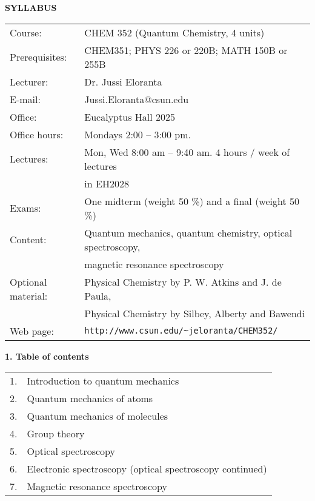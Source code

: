 \documentclass{report}
\begin{document}
\setlength{\parindent}{0pt}
\textbf{SYLLABUS}\\

\begin{tabular}{ll}
Course:   & CHEM 352 (Quantum Chemistry, 4 units)\\
Prerequisites: & CHEM351; PHYS 226 or 220B; MATH 150B or 255B\\
Lecturer: & Dr. Jussi Eloranta\\
E-mail:	  & Jussi.Eloranta@csun.edu\\
Office:	  & Eucalyptus Hall 2025\\
Office hours: & Mondays 2:00 -- 3:00 pm.\\
Lectures: & Mon, Wed 8:00 am -- 9:40 am. 4 hours / week of lectures\\
          & in EH2028\\
Exams: & One midterm (weight 50 \%) and a final (weight 50 \%)\\
Content: & Quantum mechanics, quantum chemistry, optical spectroscopy,\\
         & magnetic resonance spectroscopy\\
Optional material: & Physical Chemistry by P. W. Atkins and J. de Paula,\\
                   & Physical Chemistry by Silbey, Alberty and Bawendi\\
Web page: & \verb+http://www.csun.edu/~jeloranta/CHEM352/+\\
\end{tabular}

\vspace{0.5cm}

\textbf{1. Table of contents}\\

\begin{tabular}{l@{\extracolsep{3cm}}l}
1. & Introduction to quantum mechanics\\
2. & Quantum mechanics of atoms\\
3. & Quantum mechanics of molecules\\
4. & Group theory\\
5. & Optical spectroscopy\\
6. & Electronic spectroscopy (optical spectroscopy continued)\\
7. & Magnetic resonance spectroscopy\\
\end{tabular}

\vspace*{0.4cm}
\end{document}
